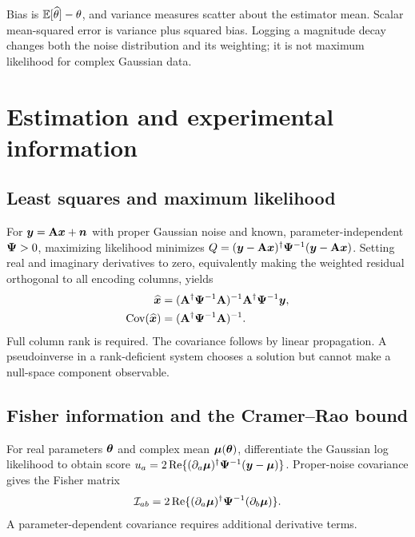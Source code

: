 Bias is $\operatorname{\mathbb{E}}[\widehat\theta]-\theta$, and variance measures scatter about
the estimator mean. Scalar mean-squared error is variance plus squared bias.
Logging a magnitude decay changes both the noise distribution and its
weighting; it is not maximum likelihood for complex Gaussian data.

\section{Estimation and experimental information}
\label{sec:01:estimation-and-experimental-information}
\subsection{Least squares and maximum likelihood}
For $\bm{y}=\mathbf{A}\bm{x}+\bm{n}$ with proper Gaussian noise and known,
parameter-independent $\mathbf{\Psi}>0$, maximizing likelihood minimizes
$Q=(\bm{y}-\mathbf{A}\bm{x})^{\dagger}\mathbf{\Psi}^{-1}
(\bm{y}-\mathbf{A}\bm{x})$.
Setting real and imaginary derivatives to zero, equivalently making the
weighted residual orthogonal to all encoding columns, yields
\begin{equation}
 \begin{split}
 \widehat{\bm{x}}&=(\mathbf{A}^{\dagger}\mathbf{\Psi}^{-1}\mathbf{A})^{-1}
                    \mathbf{A}^{\dagger}\mathbf{\Psi}^{-1}\bm{y},\\
 \operatorname{Cov}(\widehat{\bm{x}})&=(\mathbf{A}^{\dagger}\mathbf{\Psi}^{-1}\mathbf{A})^{-1}.
 \end{split}
 \label{eq:01:wls}
\end{equation}
Full column rank is required. The covariance follows by linear propagation.
A pseudoinverse in a rank-deficient system chooses a solution but cannot
make a null-space component observable.

\subsection{Fisher information and the Cramer--Rao bound}
For real parameters $\bm{\theta}$ and complex mean $\bm{\mu}(\bm{\theta})$,
differentiate the Gaussian log likelihood to obtain score
$u_a=2\operatorname{Re}\{(\partial_a\bm{\mu})^{\dagger}
\mathbf{\Psi}^{-1}(\bm{y}-\bm{\mu})\}$.
Proper-noise covariance gives the Fisher matrix
\begin{equation}
 \mathcal I_{ab}
 =2\operatorname{Re}\{(\partial_a\bm{\mu})^{\dagger}
                         \mathbf{\Psi}^{-1}(\partial_b\bm{\mu})\}.
 \label{eq:01:fisher}
\end{equation}
A parameter-dependent covariance requires additional derivative terms.

